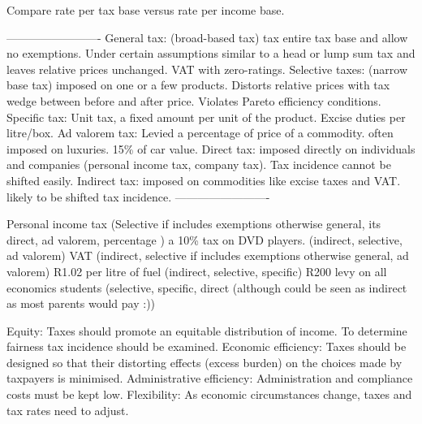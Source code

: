 \documentclass[12pt]{examnotes}
\begin{document}
\ra Compare rate per tax base versus rate per income base.

-------------------------
\ra General tax: (broad-based tax) tax entire tax base and allow no exemptions. Under certain assumptions similar to a head or lump sum tax and leaves relative prices unchanged. VAT with zero-ratings.
\ra Selective taxes: (narrow base tax) imposed on one or a few products. Distorts relative prices with tax wedge between before and after price. Violates Pareto efficiency conditions.
\ra Specific tax: Unit tax, a fixed amount per unit of the product. Excise duties per litre/box.           
\ra Ad valorem tax: Levied a percentage of price of a commodity. often imposed on luxuries. 15\% of car value.
\ra Direct tax: imposed directly on individuals and companies (personal income tax, company tax). Tax incidence cannot be shifted easily.
\ra Indirect tax: imposed on commodities like excise taxes and VAT. likely to be shifted tax incidence.
-------------------------

 Personal income tax (Selective if includes exemptions otherwise general, its direct, ad valorem, percentage )
 a 10\% tax on DVD players. (indirect, selective, ad valorem)
 VAT (indirect, selective if includes exemptions otherwise general, ad valorem)
 R1.02 per litre of fuel (indirect, selective, specific)
 R200 levy on all economics students (selective, specific, direct (although could be seen as indirect as most parents would pay :))

\ra Equity: Taxes should promote an equitable distribution of income. To determine fairness tax incidence should be examined.
\ra Economic efficiency: Taxes should be designed so that their distorting effects (excess burden) on the choices made by taxpayers is minimised.
\ra Administrative efficiency: Administration and compliance costs must be kept low.
\ra Flexibility: As economic circumstances change, taxes and tax rates need to adjust.
\end{document}
